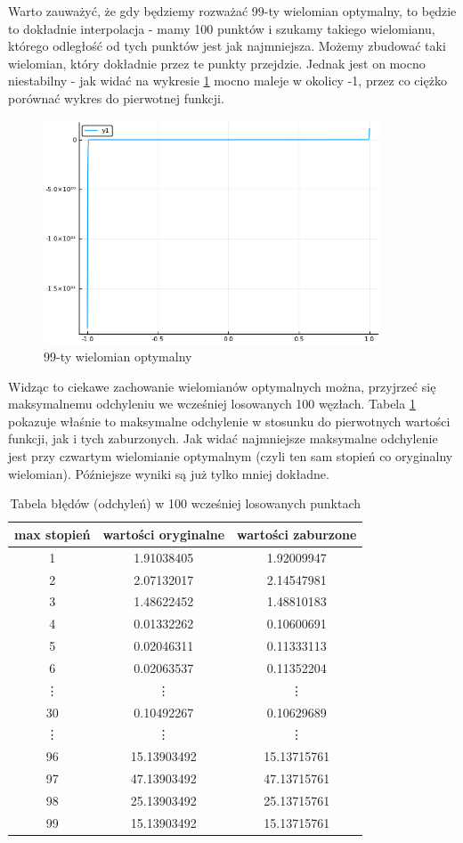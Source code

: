 \documentclass[11pt]{article}
\begin{document}
Warto zauważyć, że gdy będziemy rozważać 99-ty wielomian optymalny, to będzie to dokładnie interpolacja - mamy 100 punktów i szukamy takiego wielomianu, którego odległość od tych punktów jest jak najmniejsza. Możemy zbudować taki wielomian, który dokładnie przez te punkty przejdzie. Jednak jest on mocno niestabilny - jak widać na wykresie \ref{fig:wykres5} mocno maleje w okolicy -1, przez co ciężko porównać wykres do pierwotnej funkcji. 
\begin{figure}[!htbp]
  \includegraphics[width=10cm]{opt99.png}
  \centering
  \caption{99-ty wielomian optymalny}
  \label{fig:wykres5}
\end{figure}

Widząc to ciekawe zachowanie wielomianów optymalnych można, przyjrzeć się maksymalnemu odchyleniu we wcześniej losowanych 100 węzłach. Tabela \ref{table:bledy} pokazuje właśnie to maksymalne odchylenie w stosunku do pierwotnych wartości funkcji, jak i tych zaburzonych. Jak widać najmniejsze maksymalne odchylenie jest przy czwartym wielomianie optymalnym (czyli ten sam stopień co oryginalny wielomian). Późniejsze wyniki są już tylko mniej dokładne.
\begin{table}
\begin{center}
\begin{tabular}{ c| c| c }
max stopień &wartości oryginalne & wartości zaburzone \\
\hline
1 & 1.91038405 & 1.92009947 \\
2 & 2.07132017 & 2.14547981 \\
3 & 1.48622452 & 1.48810183 \\
4 & 0.01332262 & 0.10600691 \\
5 & 0.02046311 & 0.11333113 \\
6 & 0.02063537 & 0.11352204 \\
\vdots & \vdots & \vdots \\
30 & 0.10492267 & 0.10629689 \\
\vdots & \vdots & \vdots \\
96 & 15.13903492 & 15.13715761 \\
97 & 47.13903492 & 47.13715761 \\
98 & 25.13903492 & 25.13715761 \\
99 & 15.13903492 & 15.13715761 \\
\end{tabular}
\end{center}
\caption{Tabela błędów (odchyleń) w 100 wcześniej losowanych punktach}
\label{table:bledy}
\end{table}
\end{document}
